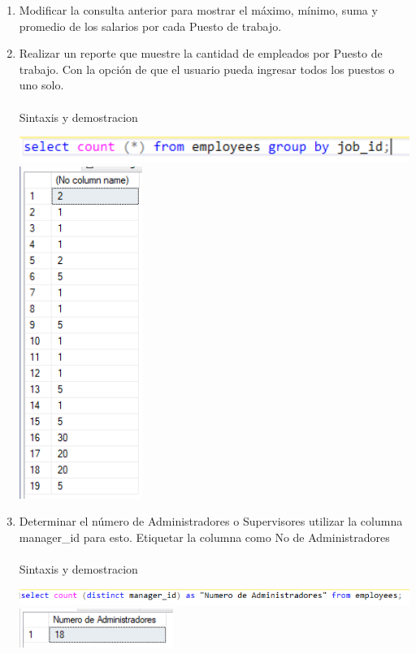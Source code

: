 \begin{enumerate}[1.]
	\item Modificar la consulta anterior para mostrar el máximo, mínimo, suma y promedio de los salarios por cada Puesto de trabajo. 
	\item Realizar un reporte que muestre la cantidad de empleados por Puesto de trabajo. Con la opción de que el usuario pueda ingresar todos los puestos o uno solo.
	\\	
	\\Sintaxis y demostracion
	\begin{center}
	\includegraphics[width=15cm]{./Imagenes/73} 
	\includegraphics[width=4cm]{./Imagenes/732} 
	\end{center}
	\item Determinar el n\'umero de Administradores o Supervisores utilizar la columna manager\_id para esto. Etiquetar la columna como No de Administradores
	\\	
	\\Sintaxis y demostracion
	\begin{center}
	\includegraphics[width=15cm]{./Imagenes/74} 
	\includegraphics[width=5cm]{./Imagenes/742} 

\end{center}
\end{enumerate}
